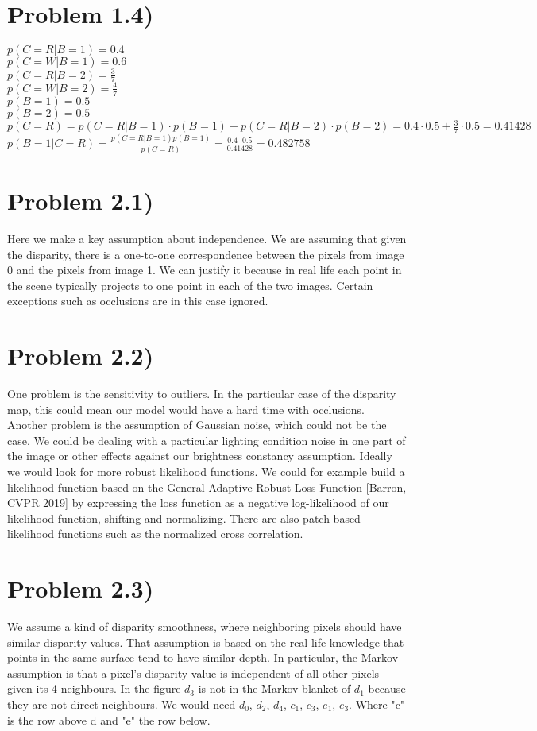 \documentclass[11pt]{article} %
\begin{document}
	\section*{Problem 1.4)}
	$p(C=R \lvert B=1) = 0.4$\\
	$p(C=W \lvert B=1) = 0.6$\\
	$p(C=R \lvert B=2) = \frac{3}{7}$\\
	$p(C=W \lvert B=2) = \frac{4}{7}$\\
	$p(B=1) = 0.5$\\
	$p(B=2) = 0.5$\\
	$p(C=R) = p(C=R \lvert B=1) \cdot p(B=1) + p(C=R \lvert B=2) \cdot p(B=2) = 0.4 \cdot 0.5 + \frac{3}{7}\cdot 0.5 = 0.41428$\\
	$p(B=1 \lvert C=R) = \frac{p(C=R \lvert B=1)p(B=1)}{p(C=R)} = \frac{0.4 \cdot 0.5}{0.41428} = 0.482758$\\
	\newpage
	\section*{Problem 2.1)}
 	Here we make a key assumption about  independence. We are assuming that given the disparity, there is a one-to-one correspondence between the pixels from image 0 and the pixels from image 1. We can justify it because in real life each point in the scene typically projects to one point in each of the two images. Certain exceptions such as occlusions are in this case ignored.
	
	\section*{Problem 2.2)}
 	One problem is the sensitivity to outliers. In the particular case of the disparity map, this could mean our model would have a hard time with  occlusions. Another problem is the assumption of Gaussian noise, which could not be the case. We could be dealing with a particular lighting condition noise in one part of the image or other effects against our brightness constancy assumption.  Ideally we would look for more robust likelihood functions. We could for example build a likelihood function based on the General Adaptive Robust Loss Function [Barron, CVPR 2019] by expressing the loss function as a negative log-likelihood of our likelihood function, shifting and normalizing. There are also patch-based likelihood functions such as the normalized cross correlation.

	\section*{Problem 2.3)}
 	We assume a kind of disparity smoothness, where neighboring pixels should have similar disparity values. That assumption is based on the real life knowledge that points in the same surface tend to have similar depth. In particular, the Markov assumption is that a pixel's disparity value is independent of all other pixels given its 4 neighbours. In the figure ${d}_{3}$ is not in the Markov blanket of ${d}_{1}$ because they are not direct neighbours. We would need ${d}_{0}$, ${d}_{2}$, ${d}_{4}$, ${c}_{1}$, ${c}_{3}$, ${e}_{1}$, ${e}_{3}$. Where "c" is the row above d and "e" the row below.
\end{document}
